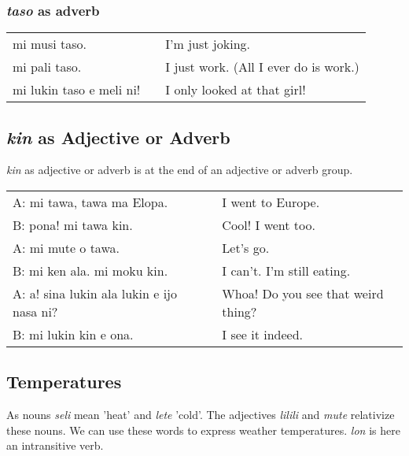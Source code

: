 {\subsubsection*{\textit{taso} as adverb}
%
\begin{supertabular}{p{5,5cm}|ll}
mi musi taso. && I'm just joking. \\
mi pali taso. && I just work. (All I ever do is work.) \\ 
mi lukin taso e meli ni! && I only looked at that girl!  \\
\end{supertabular} 
%
\subsection*{\textit{kin} as Adjective or Adverb}
%
%
\textit{kin} as adjective or adverb is at the end of an adjective or adverb group.

\begin{supertabular}{p{5,5cm}|ll}
A: mi tawa, tawa ma Elopa. && I went to Europe. \\
B: pona! mi tawa kin. && Cool! I went too. \\
A: mi mute o tawa. && Let's go. \\
B: mi ken ala. mi moku kin. && I can't. I'm still eating. \\
A: a! sina lukin ala lukin e ijo nasa ni? && Whoa! Do you see that weird thing? \\
B: mi lukin kin e ona. && I see it indeed. \\
\end{supertabular} 

%
%
%
%
\subsection*{Temperatures}
%
%
As nouns \textit{seli} mean 'heat' and \textit{lete} 'cold'. 
The adjectives \textit{lilili} and \textit{mute} relativize these nouns. 
We can use these words to express weather temperatures. 
\textit{lon} is here an intransitive verb. 

}
